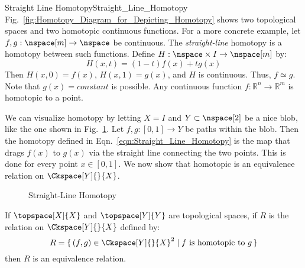 \documentclass{article}                                                        %
\begin{document}
        \begin{lexample}{Straight Line Homotopy}{Straight_Line_Homotopy}
            Fig.~\ref{fig:Homotopy_Diagram_for_Depicting_Homotopy} shows
            two topological spaces and two homotopic continuous functions.
            For a more concrete example, let $f,g:\nspace[m]\rightarrow\nspace$
            be continuous. The \textit{straight-line} homotopy is a homotopy
            between such functions. Define
            $H:\nspace\times{I}\rightarrow\nspace[m]$ by:
            \begin{equation}
                \label{eqn:Straight_Line_Homotopy}%
                H(x,t)=(1-t)f(x)+tg(x)
            \end{equation}
            Then $H(x,0)=f(x)$, $H(x,1)=g(x)$, and $H$ is continuous. Thus,
            ${f}\simeq{g}$. Note that $g(x)=constant$ is possible. Any
            continuous function $f:\mathbb{R}^{n}\rightarrow\mathbb{R}^{m}$
            is homotopic to a point.
        \end{lexample}
        We can visualize homotopy by letting $X=I$ and $Y\subset\nspace[2]$ be a
        nice blob, like the one shown in Fig.~\ref{fig:straight_line_homotopy}.
        Let $f,g:[0,1]\rightarrow Y$ be paths within the blob. Then the homotopy
        defined in Eqn.~\ref{eqn:Straight_Line_Homotopy} is the map that
        drags $f(x)$ to $g(x)$ via the straight line connecting the two points.
        This is done for every point $x\in [0,1]$.
        We now show that homotopic is an equivalence relation on
        $\Ckspace[Y]{}{X}$.
        \begin{figure}[H]
            \centering
            \captionsetup{type=figure}
            
            \caption{Straight-Line Homotopy}
            \label{fig:straight_line_homotopy}
        \end{figure}
        \begin{theorem}
            If $\topspace[X]{X}$ and $\topspace[Y]{Y}$ are topological spaces,
            if $R$ is the relation on $\Ckspace[Y]{}{X}$ defined by:
            \begin{equation}
                R=\{\,(f,g)\in\Ckspace[Y]{}{X}^{2}\;|\;
                    f\textrm{ is homotopic to }g\,\}
            \end{equation}
            then $R$ is an equivalence relation.
        \end{theorem}
\end{document}
